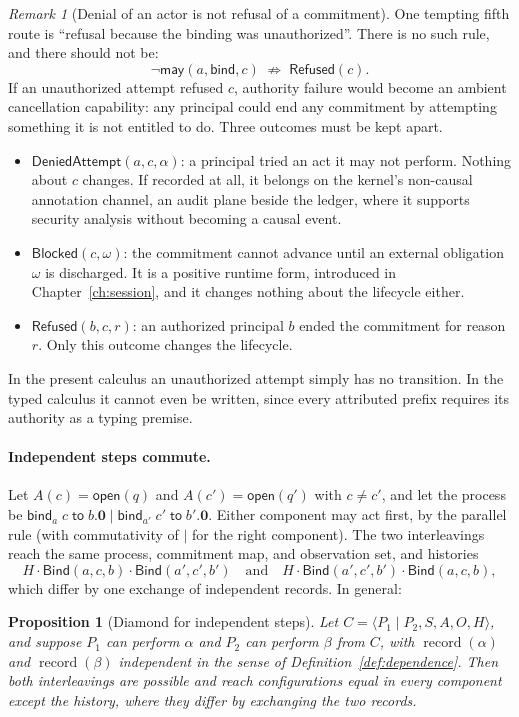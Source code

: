 \documentclass[11pt,openany]{book}
\newtheorem{proposition}[theorem]{Proposition}
\theoremstyle{remark}
\newtheorem{remark}[theorem]{Remark}
\newcommand{\Bind}{\mathsf{Bind}}
\newcommand{\record}{\operatorname{record}}
\begin{document}
\begin{remark}[Denial of an actor is not refusal of a commitment]
One tempting fifth route is ``refusal because the binding was
unauthorized''. There is no such rule, and there should not be:
\[
\neg\mathsf{may}(a,\mathsf{bind},c)\;\not\Rightarrow\;\mathsf{Refused}(c).
\]
If an unauthorized attempt refused $c$, authority failure would become an
ambient cancellation capability: any principal could end any commitment by
attempting something it is not entitled to do. Three outcomes must be kept
apart.
\begin{itemize}[leftmargin=1.5em]
\item $\mathsf{DeniedAttempt}(a,c,\alpha)$: a principal tried an act it
may not perform. Nothing about $c$ changes. If recorded at all, it belongs
on the kernel's non-causal annotation channel, an audit plane beside the
ledger, where it supports security analysis without becoming a causal
event.
\item $\mathsf{Blocked}(c,\omega)$: the commitment cannot advance until an
external obligation $\omega$ is discharged. It is a positive runtime form,
introduced in Chapter~\ref{ch:session}, and it changes nothing about the
lifecycle either.
\item $\mathsf{Refused}(b,c,r)$: an authorized principal $b$ ended the
commitment for reason $r$. Only this outcome changes the lifecycle.
\end{itemize}
In the present calculus an unauthorized attempt simply has no transition.
In the typed calculus it cannot even be written, since every attributed
prefix requires its authority as a typing premise.
\end{remark}

\paragraph{Independent steps commute.}
Let $A(c)=\mathsf{open}(q)$ and $A(c')=\mathsf{open}(q')$ with $c\neq c'$,
and let the process be
$\mathsf{bind}_a\;c\;\mathsf{to}\;b.\mathbf 0\mid
\mathsf{bind}_{a'}\;c'\;\mathsf{to}\;b'.\mathbf 0$. Either component may
act first, by the parallel rule (with commutativity of $\mid$ for the right
component). The two interleavings reach the same process, commitment map,
and observation set, and histories
\[
H\cdot\Bind(a,c,b)\cdot\Bind(a',c',b')
\quad\text{and}\quad
H\cdot\Bind(a',c',b')\cdot\Bind(a,c,b),
\]
which differ by one exchange of independent records. In general:

\begin{proposition}[Diamond for independent steps]\label{prop:diamond}
Let $C=\langle P_1\mid P_2,S,A,O,H\rangle$, and suppose $P_1$ can perform
$\alpha$ and $P_2$ can perform $\beta$ from $C$, with
$\record(\alpha)$ and $\record(\beta)$ independent in the sense of
Definition~\ref{def:dependence}. Then both interleavings are possible and
reach configurations equal in every component except the history, where
they differ by exchanging the two records.
\end{proposition}
\end{document}
